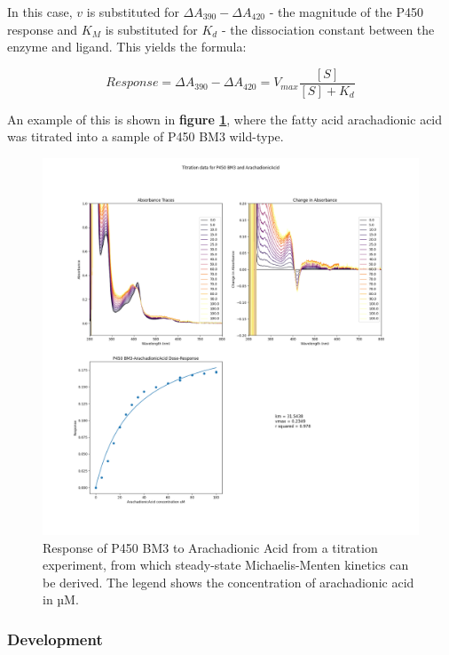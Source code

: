 \documentclass{article}
\begin{document}
In this case, $v$ is substituted for $\Delta A_{390} - \Delta A_{420}$ - the magnitude of the P450 response and $K_M$ is substituted for $K_d$ - the dissociation constant between the enzyme and ligand.
This yields the formula:

\begin{equation}
	Response = \Delta A_{390} - \Delta A_{420} = V_{max} \frac{[S]}{[S] + K_d} 
\end{equation}

An example of this is shown in \textbf{figure \ref{arachadionictitration}}, where the fatty acid arachadionic acid was titrated into a sample of P450 BM3 wild-type.

\begin{figure}
	\caption{\label{arachadionictitration} Response of P450 BM3 to Arachadionic Acid from a titration experiment, from which steady-state Michaelis-Menten kinetics can be derived. The legend shows the concentration of arachadionic acid in µM.}
	\includegraphics[width = \textwidth]{img/ArachadionicAcid.png}
\end{figure}


\subsubsection{Development}
\end{document}
